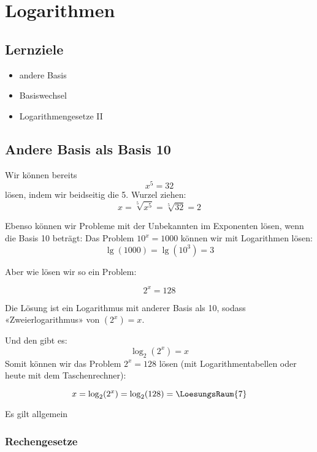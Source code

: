 
\section{Logarithmen}
\subsection*{Lernziele}

\begin{itemize}
\item andere Basis
\item Basiswechsel
\item Logarithmengesetze II
\end{itemize}
\newpage

\subsection{Andere Basis als Basis 10}

Wir können bereits $$x^5=32$$ lösen, indem wir beidseitig die 5. Wurzel ziehen: $$x = \sqrt[5]{x^5} = \sqrt[5]{32} = 2$$

Ebenso können wir Probleme mit der Unbekannten im Exponenten lösen, wenn die Basis 10 beträgt: Das Problem $10^x = 1000$ können wir mit Logarithmen lösen: $$\lg(1000) = \lg(10^3) = 3$$

Aber wie lösen wir so ein Problem:

$$2^x = 128$$

Die Lösung ist ein Logarithmus mit anderer Basis als 10, sodass «Zweierlogarithmus» von $(2^x) = x$.

Und den gibt es:
$$\log_2(2^x) = x$$
Somit können wir das Problem $2^x=128$ lösen (mit Logarithmentabellen oder heute mit dem Taschenrechner):

$$x = \log_2(2^x) = \log_2(128) = \LoesungsRaum{7}$$

Es gilt allgemein

\begin{center}
\end{center}
\newpage

\subsubsection{Rechengesetze}

